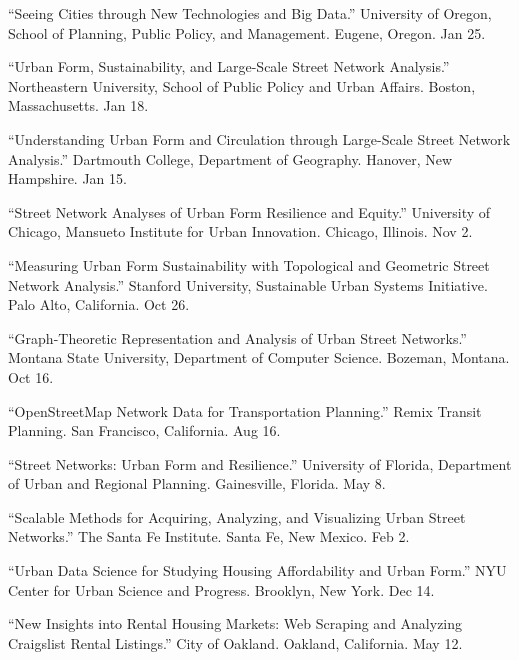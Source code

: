 \documentclass[11pt,letterpaper]{report} %
\begin{document}
\begin{tablist}
\item[2018] \tab{}\enquote{Seeing Cities through New Technologies and Big Data.} University of Oregon, School of Planning, Public Policy, and Management. Eugene, Oregon. Jan 25.

\item[2018] \tab{}\enquote{Urban Form, Sustainability, and Large-Scale Street Network Analysis.} Northeastern University, School of Public Policy and Urban Affairs. Boston, Massachusetts. Jan 18.

\item[2018] \tab{}\enquote{Understanding Urban Form and Circulation through Large-Scale Street Network Analysis.} Dartmouth College, Department of Geography. Hanover, New Hampshire. Jan 15.

\item[2017] \tab{}\enquote{Street Network Analyses of Urban Form Resilience and Equity.} University of Chicago, Mansueto Institute for Urban Innovation. Chicago, Illinois. Nov 2.

\item[2017] \tab{}\enquote{Measuring Urban Form Sustainability with Topological and Geometric Street Network Analysis.} Stanford University, Sustainable Urban Systems Initiative. Palo Alto, California. Oct 26.

\item[2017] \tab{}\enquote{Graph-Theoretic Representation and Analysis of Urban Street Networks.} Montana State University, Department of Computer Science. Bozeman, Montana. Oct 16.

\item[2017] \tab{}\enquote{OpenStreetMap Network Data for Transportation Planning.} Remix Transit Planning. San Francisco, California. Aug 16.

\item[2017] \tab{}\enquote{Street Networks: Urban Form and Resilience.} University of Florida, Department of Urban and Regional Planning. Gainesville, Florida. May 8.

\item[2017] \tab{}\enquote{Scalable Methods for Acquiring, Analyzing, and Visualizing Urban Street Networks.} The Santa Fe Institute. Santa Fe, New Mexico. Feb 2.

\item[2016] \tab{}\enquote{Urban Data Science for Studying Housing Affordability and Urban Form.} NYU Center for Urban Science and Progress. Brooklyn, New York. Dec 14.

\item[2016] \tab{}\enquote{New Insights into Rental Housing Markets: Web Scraping and Analyzing Craigslist Rental Listings.} City of Oakland. Oakland, California. May 12.


\end{tablist}
\end{document}

